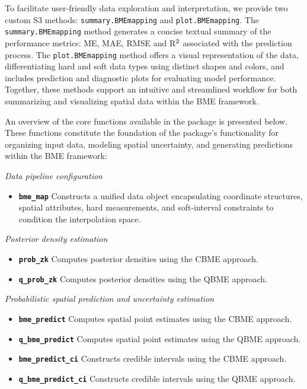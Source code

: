 To facilitate user-friendly data exploration and interpretation, we provide two custom S3 methods: \texttt{summary.BMEmapping} and \texttt{plot.BMEmapping}. The \texttt{summary.BMEmapping} method generates a concise textual summary of the performance metrics: ME, MAE, RMSE and R\(^{\scriptsize 2}\) associated with the prediction process. The \texttt{plot.BMEmapping} method offers a visual representation of the data, differentiating hard and soft data types using distinct shapes and colors, and includes prediction and diagnostic plots for evaluating model performance. Together, these methods support an intuitive and streamlined workflow for both summarizing and visualizing spatial data within the BME framework.

An overview of the core functions available in the  package is presented below. These functions constitute the foundation of the package's functionality for organizing input data, modeling spatial uncertainty, and generating predictions within the BME framework:

\emph{Data pipeline configuration}

\begin{itemize}
\tightlist
\item
  \textbf{\texttt{bme\_map}}
  Constructs a unified data object encapsulating coordinate structures, spatial attributes, hard measurements, and soft-interval constraints to condition the interpolation space.
\end{itemize}

\emph{Posterior density estimation}

\begin{itemize}
\tightlist
\item
  \textbf{\texttt{prob\_zk}}
  Computes posterior densities using the CBME approach.
\item
  \textbf{\texttt{q\_prob\_zk}}
  Computes posterior densities using the QBME approach.
\end{itemize}

\emph{Probabilistic spatial prediction and uncertainty estimation}

\begin{itemize}
\tightlist
\item
  \textbf{\texttt{bme\_predict}}
  Computes spatial point estimates using the CBME approach.
\item
  \textbf{\texttt{q\_bme\_predict}}
  Computes spatial point estimates using the QBME approach.
\item
  \textbf{\texttt{bme\_predict\_ci}}
  Constructs credible intervals using the CBME approach.
\item
  \textbf{\texttt{q\_bme\_predict\_ci}}
  Constructs credible intervals using the QBME approach.
\end{itemize}

